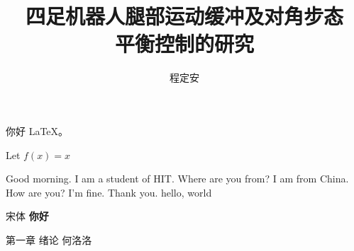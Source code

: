 \documentclass[10pt]{article}
\title{四足机器人腿部运动缓冲及对角步态\\平衡控制的研究}
\author{程定安}
\begin{document}
    \maketitle
    你好 \LaTeX 。

    Let $f(x)=x$

    Good morning. I am a student of HIT. Where are you from? I am from China.
    How are you? I'm fine. Thank you.
    hello, world

    {\songti 宋体}
    \textbf{你好}

     {\heiti 第一章 绪论}
    \LARGE 何洛洛
\end{document}
